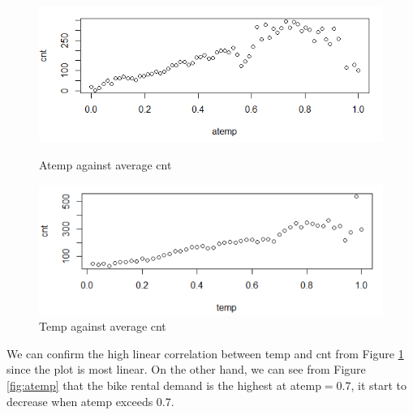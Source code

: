 \documentclass[12pt]{article}
\begin{document}
	\begin{figure}[H]
		\centering
		\begin{minipage}{.44\textwidth}
			\centering
			\includegraphics[width=\linewidth]{figures/atemp_cnt.png}
			\caption{Atemp against average cnt}
			\label{fig:atemp}
		\end{minipage}%
		\begin{minipage}{.44\textwidth}
			\centering
			\includegraphics[width=\linewidth]{figures/temp_cnt.png}
			\caption{Temp against average cnt}
			\label{fig:temp}
		\end{minipage}
	\end{figure}
   We can confirm the high linear correlation between temp and cnt from Figure \ref{fig:temp} since the plot is most linear. On the other hand, we can see from Figure \ref{fig:atemp} that the bike rental demand is the highest at atemp$=0.7$, it start to decrease when atemp exceeds 0.7. 
	
\end{document}
